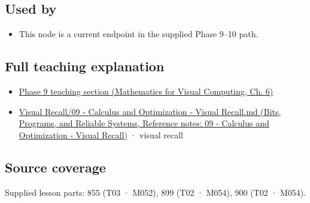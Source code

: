 \subsection{Used by}\label{appendix-8836553d56fc-used-by}

\begin{itemize}
\tightlist
\item
  This node is a current endpoint in the supplied Phase 9--10 path.
\end{itemize}

\subsection{Full teaching explanation}\label{appendix-8836553d56fc-full-teaching-explanation}

\begin{itemize}
\tightlist
\item
  \href{../02-Mathematics-for-Visual-Computing/main.pdf\#nameddest=02-foundations-ii-ch022-numerical-differentiation-and-automatic-differentiation}{Phase 9 teaching section (Mathematics for Visual Computing, Ch. 6)}
\item
  \href{../01-Bits-Programs-and-Reliable-Systems/main.pdf\#nameddest=appendix-adf48f5dc5c1}{Visual Recall/09 - Calculus and Optimization - Visual Recall.md (Bits, Programs, and Reliable Systems, Reference notes: 09 - Calculus and Optimization - Visual Recall)} · visual recall
\end{itemize}

\subsection{Source coverage}\label{appendix-8836553d56fc-source-coverage}

Supplied lesson parts: 855 (T03 · M052), 899 (T02 · M054), 900 (T02 · M054).
